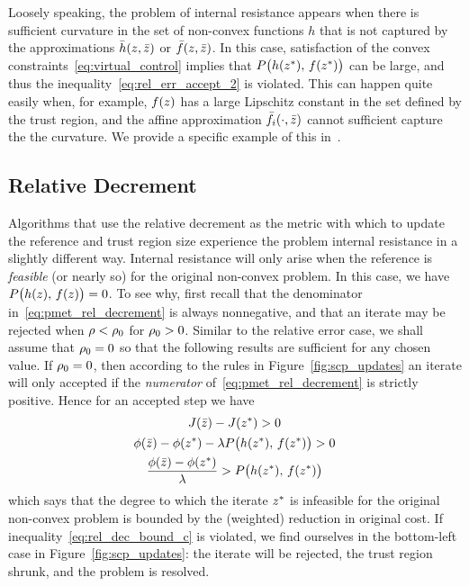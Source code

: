 \documentclass[letterpaper, 10 pt, conference]{ieeeconf}
\begin{document}
Loosely speaking, the problem of internal resistance appears when there is sufficient curvature in the set of non-convex functions $h$ that is not captured by the approximations $\bar{h}(z,\bar{z})$ or $\bar{f}(z,\bar{z})$. In this case, satisfaction of the convex constraints~\eqref{eq:virtual_control} implies that $P\big(h(z^*),\,f(z^*)\big)$ can be large, and thus the inequality~\eqref{eq:rel_err_accept_2} is violated. This can happen quite easily when, for example, $f(z)$ has a large Lipschitz constant in the set defined by the trust region, and the affine approximation $\bar{f}_i(\cdot,\bar{z})$ cannot sufficient capture the the curvature. We provide a specific example of this in~.

\subsection{Relative Decrement}\label{subsec:crepp_rel_dec}

Algorithms that use the relative decrement as the metric with which to update the reference and trust region size experience the problem internal resistance in a slightly different way. Internal resistance will only arise when the reference is \textit{feasible} (or nearly so) for the original non-convex problem. In this case, we have $P\big(h(z),\,f(z)\big)=0$. To see why, first recall that the denominator in~\eqref{eq:pmet_rel_decrement} is always nonnegative, and that an iterate may be rejected when $\rho<\rho_0$ for $\rho_0>0$. Similar to the relative error case, we shall assume that $\rho_0=0$ so that the following results are sufficient for any chosen value. If $\rho_0=0$, then according to the rules in Figure~\ref{fig:scp_updates} an iterate will only accepted if the \textit{numerator} of~\eqref{eq:pmet_rel_decrement} is strictly positive. Hence for an accepted step we have
\begin{subequations}\label{eq:rel_dec_bound}
\begin{gather}
J(\bar{z}) - J(z^*) > 0 \label{eq:rel_dec_bound_a}\\
\phi(\bar{z}) - \phi(z^*) - \lambda P\big( h(z^*),\,f(z^*) \big) > 0 \label{eq:rel_dec_bound_b}\\
 \frac{\phi(\bar{z}) - \phi(z^*)}{\lambda}  > P\big( h(z^*),\,f(z^*) \big) \label{eq:rel_dec_bound_c}
\end{gather}
\end{subequations}
which says that the degree to which the iterate $z^*$ is infeasible for the original non-convex problem is bounded by the (weighted) reduction in original cost. If inequality~\eqref{eq:rel_dec_bound_c} is violated, we find ourselves in the bottom-left case in Figure~\ref{fig:scp_updates}: the iterate will be rejected, the trust region shrunk, and the problem is resolved. 
\end{document}

